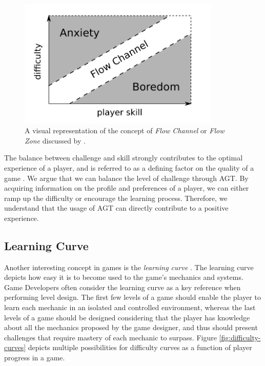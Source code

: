 \begin{figure}
    \caption{A visual representation of the concept of \emph{Flow Channel} or \emph{Flow Zone} discussed by \citet{BOOK_Flow}.}
    \begin{center}
        \includegraphics[width=26em]{figures/fig-flow-channel.png}
    \end{center}
    \label{fig:flow-channel}
\end{figure}

The balance between challenge and skill strongly contributes to the optimal experience of a player, and is referred to as a defining factor on the quality of a game \cite{ARTICLE_FearOfFailure}. We argue that we can balance the level of challenge through AGT. By acquiring information on the profile and preferences of a player, we can either ramp up the difficulty or encourage the learning process. Therefore, we understand that the usage of AGT can directly contribute to a positive experience.

\subsection{Learning Curve}
\label{sec:learning-curve}

Another interesting concept in games is the \emph{learning curve} \cite{article_learningcurve}. The learning curve depicts how easy it is to become used to the game's mechanics and systems. Game Developers often consider the learning curve as a key reference when performing level design. The first few levels of a game should enable the player to learn each mechanic in an isolated and controlled environment, whereas the last levels of a game should be designed considering that the player has knowledge about all the mechanics proposed by the game designer, and thus should present challenges that require mastery of each mechanic to surpass. Figure \ref{fig:difficulty-curves} depicts multiple possibilities for difficulty curves as a function of player progress in a game.

